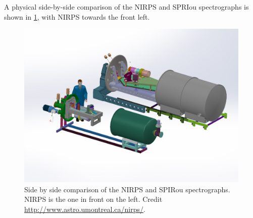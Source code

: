 A physical side-by-side comparison of the {NIRPS} and {SPRIou} spectrographs is shown in \cref{fig:nirps-vs-spirou}, with {NIRPS} towards the front left.
\begin{figure}
    \centering
    \includegraphics[width=0.7\linewidth]{figures/spectroscopy/NIRPS-vs-SPIROU}
    \caption[Side by side comparison of the {NIRPS} and {SPIRou} spectrographs.]{Side by side comparison of the {NIRPS} and {SPIRou} spectrographs.
        {NIRPS} is the one in front on the left.
        Credit \href{http://www.astro.umontreal.ca/nirps/}{http://www.astro.umontreal.ca/nirps/}.}
    \label{fig:nirps-vs-spirou}
\end{figure}

